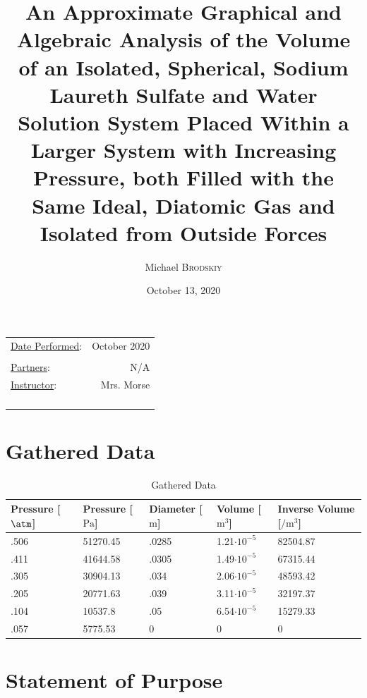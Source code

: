 \documentclass{article}
\title{An Approximate Graphical and Algebraic Analysis of the Volume of an Isolated, Spherical, Sodium Laureth Sulfate and Water Solution System Placed Within a Larger System with Increasing Pressure, both Filled with the Same Ideal, Diatomic Gas and Isolated from Outside Forces}
\author{Michael \textsc{Brodskiy}}
\date{October 13, 2020}
\begin{document}
\maketitle
\begin{center}
\begin{tabular}{l r}
\underline{Date Performed}: & October 2020 \\\\ %
\underline{Partners}: & N/A\\
\underline{Instructor}: & Mrs. Morse \\\\\\\\\\ %
\end{tabular}
\end{center}
\newpage

\tableofcontents
\listoftables
\listoffigures
\newpage

\section{Gathered Data}

\begin{table}[H]
  \centering
  \begin{tabular}{|l|l|l|l|l|}
    \hline
    Pressure [$\si{\atm}$] & Pressure [$\si{\pascal}$] & Diameter [$\si{\meter}$] & Volume [$\si{\meter\cubed}$] & Inverse Volume [$\si{\per\meter\cubed}$] \\
    \hline
    \rowcolor{Gray} .506 & 51270.45 & .0285 & 1.21$\cdot10^{-5}$ & 82504.87 \\
    \hline
    .411 & 41644.58 & .0305 & 1.49$\cdot10^{-5}$ & 67315.44 \\
    \hline
    \rowcolor{Gray} .305 & 30904.13 & .034 & 2.06$\cdot10^{-5}$ & 48593.42 \\
    \hline
    .205 & 20771.63 & .039 & 3.11$\cdot10^{-5}$ & 32197.37 \\
    \hline
    \rowcolor{Gray} .104 & 10537.8 & .05 & 6.54$\cdot10^{-5}$ & 15279.33\\
    \hline
    \rowcolor{Gray} .057 & 5775.53 & 0 & 0 & 0\\
    \hline
  \end{tabular}
  \caption{Gathered Data}
  \label{tab:1}
\end{table}

\section{Statement of Purpose}
\end{document}
